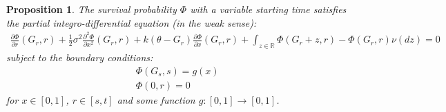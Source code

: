 \documentclass[11pt,reqno]{article}
\newtheorem{proposition}[theorem]{Proposition}
\theoremstyle{definition}
\begin{document}
\begin{proposition} \label{gen1}
	The survival probability $\Phi$ with a variable starting time satisfies the partial integro-differential equation (in the weak sense):
	\begin{eqnarray} \label{integrodiff}
	\frac{\partial \Phi}{\partial r}(G_r,r)+\frac{1}{2} \sigma^{2} \frac{\partial^{2} \Phi}{\partial x^{2}}(G_r,r)+k(\theta-G_r) \frac{\partial \Phi}{\partial x}(G_r,r)
	+ \int_{z \in \mathbb{R}}{\Phi(G_r+z,r)-\Phi(G_r,r)} \nu(dz)=0
	\end{eqnarray}
	 subject to the boundary conditions:
	 \begin{align} 
	 \Phi(G_s,s) = g(x) \,\,\ \\
	 \Phi(0,r) = 0\,\,\ 
	 \end{align} 
	 for $x \in[0,1]$, $r \in [s,t]$ and some function $g:[0,1] \rightarrow [0,1]$.
\end{proposition} 
\end{document}
